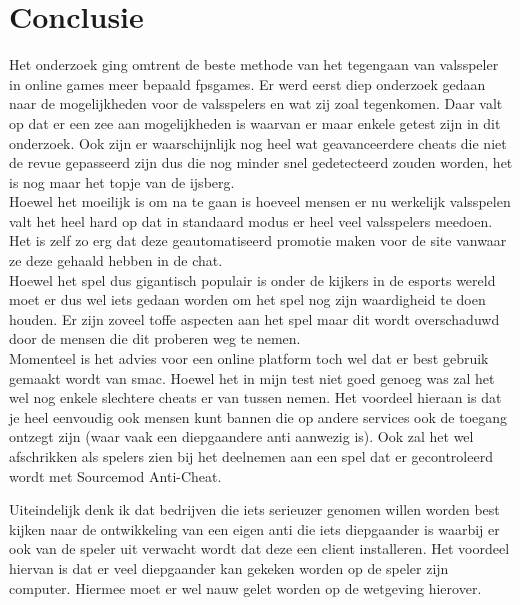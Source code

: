 \documentclass[pdftex,a4paper,12pt,twoside]{report}
\begin{document}
\chapter{Conclusie}
\label{ch:conclusie}

Het onderzoek ging omtrent de beste methode van het tegengaan van valsspeler in online games meer bepaald \gls{fpsgames}. Er werd eerst diep onderzoek gedaan naar de mogelijkheden voor de valsspelers en wat zij zoal tegenkomen. Daar valt op dat er een zee aan mogelijkheden is waarvan er maar enkele getest zijn in dit onderzoek. Ook zijn er waarschijnlijk nog heel wat geavanceerdere \gls{cheat}s die niet de revue gepasseerd zijn dus die nog minder snel gedetecteerd zouden worden, het is nog maar het topje van de ijsberg.
\\

Hoewel het moeilijk is om na te gaan is hoeveel mensen er nu werkelijk valsspelen valt het heel hard op dat in standaard modus er heel veel valsspelers meedoen. Het is zelf zo erg dat deze geautomatiseerd promotie maken voor de site vanwaar ze deze gehaald hebben in de chat.
\\

Hoewel het spel dus gigantisch populair is onder de kijkers in de \gls{esports} wereld moet er dus wel iets gedaan worden om het spel nog zijn waardigheid te doen houden. Er zijn zoveel toffe aspecten aan het spel maar dit wordt overschaduwd door de mensen die dit proberen weg te nemen.
\\

Momenteel is het advies voor een online platform toch wel dat er best gebruik gemaakt wordt van \gls{smac}. Hoewel het in mijn test niet goed genoeg was zal het wel nog enkele slechtere \gls{cheat}s er van tussen nemen. Het voordeel hieraan is dat je heel eenvoudig ook mensen kunt bannen die op andere services ook de toegang ontzegt zijn (waar vaak een diepgaandere \gls{anti} aanwezig is). Ook zal het wel afschrikken als spelers zien bij het deelnemen aan een spel dat er gecontroleerd wordt met Sourcemod Anti-Cheat. 
\newpage 

Uiteindelijk denk ik dat bedrijven die iets serieuzer genomen willen worden best kijken naar de ontwikkeling van een eigen \gls{anti} die iets diepgaander is waarbij er ook van de speler uit verwacht wordt dat deze een client installeren. Het voordeel hiervan is dat er veel diepgaander kan gekeken worden op de speler zijn computer. Hiermee moet er wel nauw gelet worden op de wetgeving hierover.





\listoffigures
\end{document}
